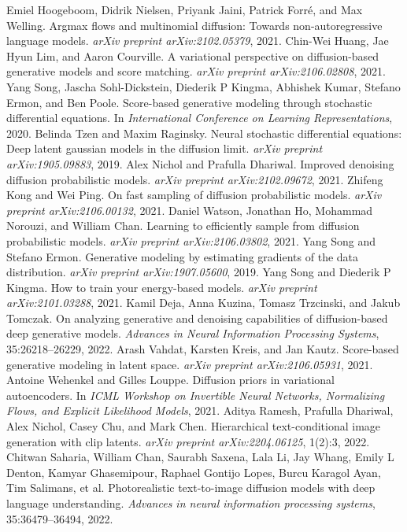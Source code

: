 \begin{chapterreferences}
 Emiel Hoogeboom, Didrik Nielsen, Priyank Jaini, Patrick Forré, and Max Welling. Argmax flows and multinomial diffusion: Towards non-autoregressive language models. \textit{arXiv preprint arXiv:2102.05379}, 2021.
 Chin-Wei Huang, Jae Hyun Lim, and Aaron Courville. A variational perspective on diffusion-based generative models and score matching. \textit{arXiv preprint arXiv:2106.02808}, 2021.
 Yang Song, Jascha Sohl-Dickstein, Diederik P Kingma, Abhishek Kumar, Stefano Ermon, and Ben Poole. Score-based generative modeling through stochastic differential equations. In \textit{International Conference on Learning Representations}, 2020.
 Belinda Tzen and Maxim Raginsky. Neural stochastic differential equations: Deep latent gaussian models in the diffusion limit. \textit{arXiv preprint arXiv:1905.09883}, 2019.
 Alex Nichol and Prafulla Dhariwal. Improved denoising diffusion probabilistic models. \textit{arXiv preprint arXiv:2102.09672}, 2021.
 Zhifeng Kong and Wei Ping. On fast sampling of diffusion probabilistic models. \textit{arXiv preprint arXiv:2106.00132}, 2021.
 Daniel Watson, Jonathan Ho, Mohammad Norouzi, and William Chan. Learning to efficiently sample from diffusion probabilistic models. \textit{arXiv preprint arXiv:2106.03802}, 2021.
 Yang Song and Stefano Ermon. Generative modeling by estimating gradients of the data distribution. \textit{arXiv preprint arXiv:1907.05600}, 2019.
 Yang Song and Diederik P Kingma. How to train your energy-based models. \textit{arXiv preprint arXiv:2101.03288}, 2021.
 Kamil Deja, Anna Kuzina, Tomasz Trzcinski, and Jakub Tomczak. On analyzing generative and denoising capabilities of diffusion-based deep generative models. \textit{Advances in Neural Information Processing Systems}, 35:26218–26229, 2022.
 Arash Vahdat, Karsten Kreis, and Jan Kautz. Score-based generative modeling in latent space. \textit{arXiv preprint arXiv:2106.05931}, 2021.
 Antoine Wehenkel and Gilles Louppe. Diffusion priors in variational autoencoders. In \textit{ICML Workshop on Invertible Neural Networks, Normalizing Flows, and Explicit Likelihood Models}, 2021.
 Aditya Ramesh, Prafulla Dhariwal, Alex Nichol, Casey Chu, and Mark Chen. Hierarchical text-conditional image generation with clip latents. \textit{arXiv preprint arXiv:2204.06125}, 1(2):3, 2022.
 Chitwan Saharia, William Chan, Saurabh Saxena, Lala Li, Jay Whang, Emily L Denton, Kamyar Ghasemipour, Raphael Gontijo Lopes, Burcu Karagol Ayan, Tim Salimans, et al. Photorealistic text-to-image diffusion models with deep language understanding. \textit{Advances in neural information processing systems}, 35:36479–36494, 2022.
\end{chapterreferences}
